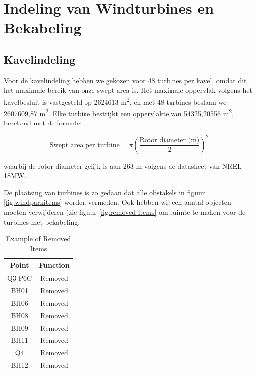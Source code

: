 \section{Indeling van Windturbines en Bekabeling}
\subsection{Kavelindeling}
Voor de kavelindeling hebben we gekozen voor 48 turbines per kavel, omdat dit het maximale bereik van onze swept area is. Het maximale oppervlak volgens het kavelbesluit is vastgesteld op 2624613 m\textsuperscript{2}, en met 48 turbines beslaan we 2607609,87 m\textsuperscript{2}. Elke turbine bestrijkt een oppervlakte van 54325,20556 m\textsuperscript{2}, berekend met de formule:

\[
\text{{Swept area per turbine}} = \pi \left(\frac{{\text{{Rotor diameter (m)}}}}{2}\right)^2
\]

waarbij de rotor diameter gelijk is aan 263 m volgens de datasheet van NREL 18MW.

De plaatsing van turbines is zo gedaan dat alle obstakels in figuur \ref{fig:windparkitems} worden vermeden. Ook hebben wij een aantal objecten moeten verwijderen (zie figuur \ref{fig:removed-items} om ruimte te maken voor de turbines met bekabeling.
\begin{table}[h]
    \centering
    \begin{tabular}{|c|c|}
        \hline
        \textbf{Point} & \textbf{Function} \\
        \hline
        Q3 P6C & Removed \\
        \hline
        BH01 & Removed \\
        \hline
        BH06 & Removed \\
        \hline
        BH08 & Removed \\
        \hline
        BH09 & Removed \\
        \hline
        BH11 & Removed \\
        \hline
        Q4 & Removed \\
        \hline
        BH12 & Removed \\
        \hline
    \end{tabular}
    \caption{Example of Removed Items}
    \label{tab:removed-items}
\end{table}

